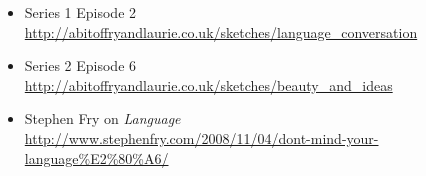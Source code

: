 \documentclass[headrule,footrule]{foils}
\begin{document}
  





\begin{itemize}
\item Series 1 Episode 2
\\ \url{http://abitoffryandlaurie.co.uk/sketches/language_conversation}
\item Series 2 Episode 6
\\ \url{http://abitoffryandlaurie.co.uk/sketches/beauty_and_ideas}
\item Stephen Fry on \textit{Language}
\\ \url{http://www.stephenfry.com/2008/11/04/dont-mind-your-language%E2%80%A6/}
\end{itemize}



\renewcommand{\section}[2]{}
\renewcommand{\baselinestretch}{0.9}
\small


\end{document}
